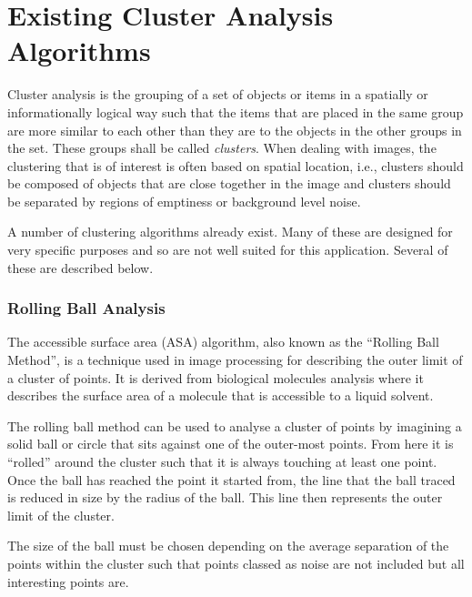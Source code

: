
\part{Existing Cluster Analysis Algorithms}
\label{prt:existing_cluster_analysis_algorithms}

Cluster analysis is the grouping of a set of objects or items in a spatially or
informationally logical way such that the items that are placed in the same
group are more similar to each other than they are to the objects in the other
groups in the set. These groups shall be called \emph{clusters}. When dealing
with images, the clustering that is of interest is often based on spatial
location, i.e., clusters should be composed of objects that are close together
in the image and clusters should be separated by regions of emptiness or
background level noise.

A number of clustering algorithms already exist. Many of these are designed for
very specific purposes and so are not well suited for this application. Several
of these are described below.

\section{Rolling Ball Analysis}
\label{sub:rolling_ball_analysis}

The accessible surface area (ASA) algorithm, also known as the ``Rolling Ball
Method'', is a technique used in image processing for describing the outer
limit of a cluster of points. It is derived from biological molecules analysis
where it describes the surface area of a molecule that is accessible to a
liquid solvent.

The rolling ball method can be used to analyse a cluster of points by imagining
a solid ball or circle that sits against one of the outer-most points. From
here it is ``rolled'' around the cluster such that it is always touching at
least one point. Once the ball has reached the point it started from, the line
that the ball traced is reduced in size by the radius of the ball. This line
then represents the outer limit of the cluster.

The size of the ball must be chosen depending on the average separation of the
points within the cluster such that points classed as noise are not included
but all interesting points are.

